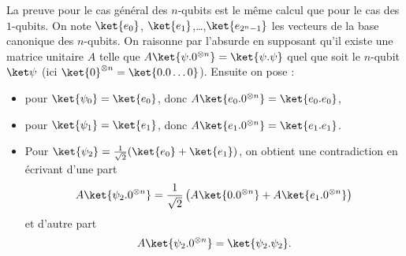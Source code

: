 \documentclass[11pt,class=report,crop=false]{standalone}
\begin{document}
La preuve pour le cas général des $n$-qubits est le même calcul que pour le cas des $1$-qubits.
On note $\ket{e_0}$, $\ket{e_1}$,\ldots,$\ket{e_{2^n-1}}$ les vecteurs de la base canonique des $n$-qubits. 
On raisonne par l'absurde en supposant qu'il existe une matrice unitaire $A$ telle que 
$A \ket{\psi.0^{\otimes n}} = \ket{\psi.\psi}$ quel que soit le $n$-qubit $\ket\psi$ (ici $\ket{0}^{\otimes n} = \ket{0.0\ldots0}$).
Ensuite on pose :
\begin{itemize}
  \item pour $\ket{\psi_0} = \ket{e_0}$, donc $A\ket{e_0.0^{\otimes n}} = \ket{e_0.e_0}$,
  \item pour $\ket{\psi_1} = \ket{e_1}$, donc $A\ket{e_1.0^{\otimes n}} = \ket{e_1.e_1}$.
  \item Pour $\ket{\psi_2} =  \frac1{\sqrt2} (\ket{e_0}+\ket{e_1})$, 
    on obtient une contradiction en écrivant d'une part
    $$A\ket{\psi_2.0^{\otimes n}} 
  = \frac1{\sqrt2} \left(A \ket{0.0^{\otimes n}} +A \ket{e_1.0^{\otimes n}}\right) $$ et d'autre part $$A\ket{\psi_2.0^{\otimes n}} = \ket{\psi_2.\psi_2}.$$
\end{itemize}
\end{document}
